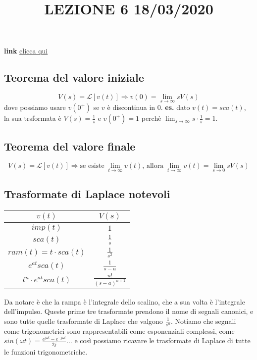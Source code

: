\title{LEZIONE 6 18/03/2020}\newline
\textbf{link} \href{https://web.microsoftstream.com/video/0c2093a0-44b9-4c83-a0b1-7e61fbd111b5?list=user&userId=faa91214-a6f5-40d7-8875-253fd49b8ce1}{clicca qui}
\subsection{Teorema del valore iniziale}
\[
    V(s) = \mathcal{L}[v(t)] \Longrightarrow v(0) = \lim_{s\rightarrow \infty}s V(s)
\] 
dove possiamo usare $v(0^+)$ se $v$ è discontinua in $0$.\newline
\newline
\textbf{es.} dato $v(t) = sca(t)$, la sua trsformata è $V(s) = \frac{1}{s}$ e $v(0^+) = 1$ perchè $\lim_{s\rightarrow \infty}s \cdot \frac{1}{s} = 1$.
\subsection{Teorema del valore finale}
\[
    V(s) = \mathcal{L}[v(t)] \Longrightarrow \text{se esiste}\; \lim_{t\rightarrow \infty} v(t) \text{, allora}\;\lim_{t\rightarrow \infty} v(t) = \lim_{s\rightarrow 0}sV(s)
\]
\subsection{Trasformate di Laplace notevoli}
\renewcommand{\arraystretch}{2}
\begin{center}
    \begin{tabular}{ |c|c| } 
     \hline
     \;\;\;\;\;\;\;\;\;\;\;\;\;\;\;$v(t)$ \;\;\;\;\;\;\;\;\;\;\;\;\;\;\;& \;\;\;\;\;\;\;\;\;\;\;\;\;\;\;$V(s)$ \;\;\;\;\;\;\;\;\;\;\;\;\;\;\;\\ 
     \hline
     $imp(t)$ & $1$ \\ 
     $sca(t)$ & $\frac{1}{s}$  \\ 
     $ram(t) = t \cdot  sca(t)$ & $\frac{1}{s^2}$ \\
     $e^{at}sca(t)$ & $\frac{1}{s-a}$ \\ 
     $t^{n}\cdot e^{at}sca(t)$ & $\frac{n!}{(s-a)^{n+1}}$\\ 
     \hline
    \end{tabular}
\end{center}
Da notare è che la rampa è l'integrale dello scalino, che a sua volta è l'integrale dell'impulso.\newline
Queste prime tre trasformate prendono il nome di segnali canonici, e sono tutte quelle trasformate di Laplace che valgono $\frac{1}{s^n}$.\newline
Notiamo che segnali come trigonometrici sono rappresentabili come esponenziali complessi, come $sin(\omega t) = \frac{e^{j \omega t}- e^{-j \omega t}}{2j} \dots$ e così possiamo ricavare le trasformate di Laplace di tutte le funzioni trigonometriche.
